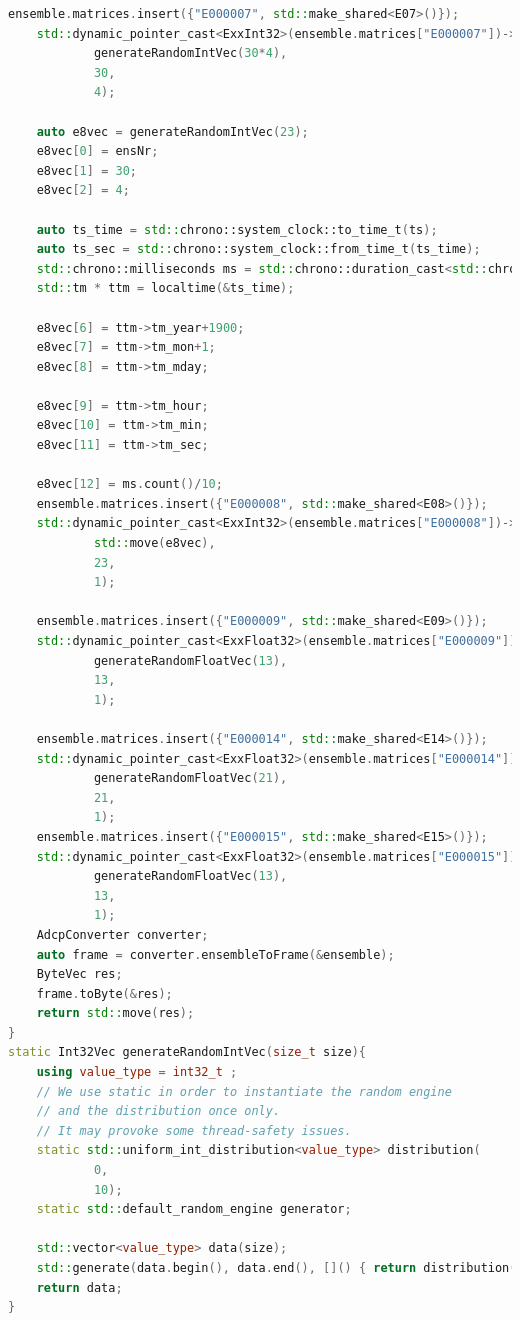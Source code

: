 \begin{lstlisting}[language=C++]
    ensemble.matrices.insert({"E000007", std::make_shared<E07>()});
    std::dynamic_pointer_cast<ExxInt32>(ensemble.matrices["E000007"])->setVector(
            generateRandomIntVec(30*4),
            30,
            4);

    auto e8vec = generateRandomIntVec(23);
    e8vec[0] = ensNr;
    e8vec[1] = 30;
    e8vec[2] = 4;

    auto ts_time = std::chrono::system_clock::to_time_t(ts);
    auto ts_sec = std::chrono::system_clock::from_time_t(ts_time);
    std::chrono::milliseconds ms = std::chrono::duration_cast<std::chrono::milliseconds>(ts - ts_sec);
    std::tm * ttm = localtime(&ts_time);

    e8vec[6] = ttm->tm_year+1900;
    e8vec[7] = ttm->tm_mon+1;
    e8vec[8] = ttm->tm_mday;

    e8vec[9] = ttm->tm_hour;
    e8vec[10] = ttm->tm_min;
    e8vec[11] = ttm->tm_sec;

    e8vec[12] = ms.count()/10;
    ensemble.matrices.insert({"E000008", std::make_shared<E08>()});
    std::dynamic_pointer_cast<ExxInt32>(ensemble.matrices["E000008"])->setVector(
            std::move(e8vec),
            23,
            1);

    ensemble.matrices.insert({"E000009", std::make_shared<E09>()});
    std::dynamic_pointer_cast<ExxFloat32>(ensemble.matrices["E000009"])->setVector(
            generateRandomFloatVec(13),
            13,
            1);

    ensemble.matrices.insert({"E000014", std::make_shared<E14>()});
    std::dynamic_pointer_cast<ExxFloat32>(ensemble.matrices["E000014"])->setVector(
            generateRandomFloatVec(21),
            21,
            1);
    ensemble.matrices.insert({"E000015", std::make_shared<E15>()});
    std::dynamic_pointer_cast<ExxFloat32>(ensemble.matrices["E000015"])->setVector(
            generateRandomFloatVec(13),
            13,
            1);
    AdcpConverter converter;
    auto frame = converter.ensembleToFrame(&ensemble);
    ByteVec res;
    frame.toByte(&res);
    return std::move(res);
}
static Int32Vec generateRandomIntVec(size_t size){
    using value_type = int32_t ;
    // We use static in order to instantiate the random engine
    // and the distribution once only.
    // It may provoke some thread-safety issues.
    static std::uniform_int_distribution<value_type> distribution(
            0,
            10);
    static std::default_random_engine generator;

    std::vector<value_type> data(size);
    std::generate(data.begin(), data.end(), []() { return distribution(generator); });
    return data;
}



\end{lstlisting}
